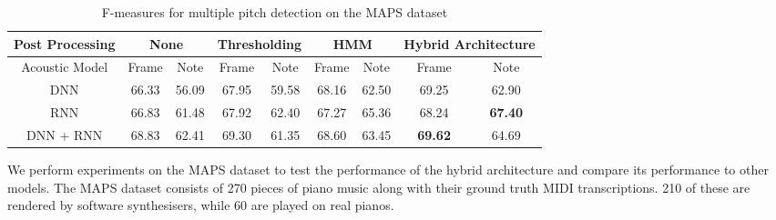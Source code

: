 \documentclass{article}
\begin{document}
\begin{table*}[htpb]
\begin{center}
  \begin{tabular}{|c| c  c | c  c | c  c | c c|}
    \hline
    Post Processing& \multicolumn{2}{|c|}{None}&\multicolumn{2}{c|}{Thresholding}&\multicolumn{2}{c|}{HMM}&\multicolumn{2}{c|}{Hybrid Architecture}\\ \hline
    Acoustic Model& Frame & Note & Frame & Note & Frame & Note & Frame & Note \\ \hline
    DNN & 66.33 & 56.09 & 67.95 &59.58 &68.16 & 62.50 & 69.25 & 62.90 \\ \hline
    RNN & 66.83 & 61.48 & 67.92 & 62.40 & 67.27 & 65.36 &68.24 & \textbf{67.40} \\ \hline
    DNN + RNN & 68.83 &62.41 &69.30 &61.35 & 68.60 & 63.45 & \textbf{69.62} &64.69 \\ \hline
  \end{tabular}%
\end{center}
\vspace{-1.8em}\caption{F-measures for multiple pitch detection on the MAPS dataset}
\end{table*}
We perform experiments on the MAPS dataset \cite{emiya2010multipitch} to test the performance of the hybrid architecture and compare its performance to other models. The MAPS dataset consists of 270 pieces of piano music along with their ground truth MIDI transcriptions. 210 of these are rendered by software synthesisers, while 60 are played on real pianos. 
\end{document}
